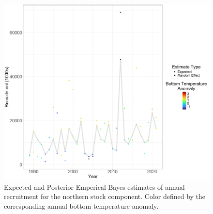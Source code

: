 \documentclass[
]{article}
\begin{document}
\begin{figure}

{\centering \includegraphics[width=1\linewidth]{best_R_Ecov} 

}

\caption{Expected and Posterior Emperical Bayes estimates of annual recruitment for the northern stock component. Color defined by the corresponding annual bottom temperature anomaly.}\label{fig:BT-Ecov-R}
\end{figure}
\pagebreak
\end{document}
